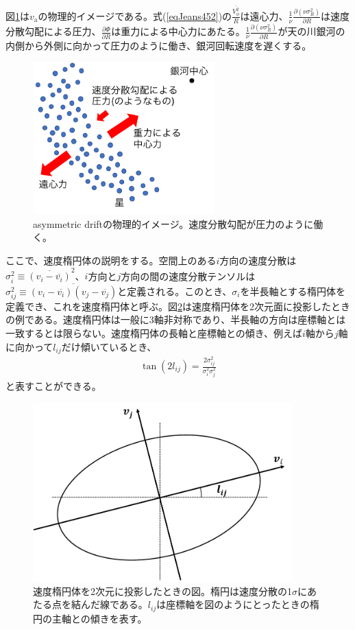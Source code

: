 図\ref{AD_image}は$v_{\mathrm{a}}$の物理的イメージである。式(\ref{eqJeans452})の$\frac{\overline{V_{\phi}^2}}{R}$は遠心力、$\frac{1}{\nu}\frac{\partial(\nu\sigma_R^2)}{\partial R}$は速度分散勾配による圧力、$\frac{\partial \Phi}{\partial R}$は重力による中心力にあたる。$\frac{1}{\nu}\frac{\partial(\nu\sigma_R^2)}{\partial R}$が天の川銀河の内側から外側に向かって圧力のように働き、銀河回転速度を遅くする。
\begin{figure}[htbp]
\begin{center}
	\includegraphics[width=7cm]{fig/AD_image.pdf}
	\caption{asymmetric driftの物理的イメージ。速度分散勾配が圧力のように働く。}
	\label{AD_image}
\end{center}
\end{figure}

ここで、速度楕円体の説明をする。空間上のある$i$方向の速度分散は$\sigma_i^2 \equiv \overline{(v_i-\overline{v_i})}^2$、$i$方向と$j$方向の間の速度分散テンソルは$\sigma_{ij}^2 \equiv \overline{(v_i-\overline{v_i})(v_j-\overline{v_j})}$と定義される。このとき、$\sigma_i$を半長軸とする楕円体を定義でき、これを速度楕円体と呼ぶ。図\ref{fig:ve}は速度楕円体を2次元面に投影したときの例である。速度楕円体は一般に3軸非対称であり、半長軸の方向は座標軸とは一致するとは限らない。速度楕円体の長軸と座標軸との傾き、例えば$i$軸から$j$軸に向かって$l_{ij}$だけ傾いているとき、
\begin{align}
    \tan(2l_{ij}) = \frac{2\sigma _{ij}^2}{\sigma_i^2 \sigma_j^2}
\end{align}
と表すことができる。

\begin{figure}[htbp]
\begin{center}
	\includegraphics[width=10cm]{fig/velocity_ellipsoid.pdf}
	\caption{速度楕円体を2次元に投影したときの図。楕円は速度分散の1$\sigma$にあたる点を結んだ線である。$l_{ij}$は座標軸を図のようにとったときの楕円の主軸との傾きを表す。}
	\label{fig:ve}
\end{center}
\end{figure}

